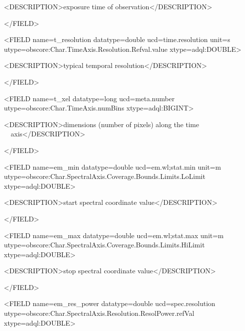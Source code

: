 \documentclass[11pt,a4paper]{ivoa}
\begin{document}
 {\textless}DESCRIPTION{\textgreater}exposure time of observation{\textless}/DESCRIPTION{\textgreater}

{\textless}/FIELD{\textgreater}

{\textless}FIELD name={\textquotedbl}t\_resolution{\textquotedbl} datatype={\textquotedbl}double{\textquotedbl}
ucd={\textquotedbl}time.resolution{\textquotedbl} unit={\textquotedbl}s{\textquotedbl}
utype={\textquotedbl}obscore:Char.TimeAxis.Resolution.Refval.value{\textquotedbl}
xtype={\textquotedbl}adql:DOUBLE{\textquotedbl}{\textgreater}

 {\textless}DESCRIPTION{\textgreater}typical temporal resolution{\textless}/DESCRIPTION{\textgreater}

{\textless}/FIELD{\textgreater}

{\textless}FIELD name={\textquotedbl}t\_xel{\textquotedbl} datatype={\textquotedbl}long{\textquotedbl}
ucd={\textquotedbl}meta.number{\textquotedbl} utype={\textquotedbl}obscore:Char.TimeAxis.numBins{\textquotedbl}
xtype={\textquotedbl}adql:BIGINT{\textquotedbl}{\textgreater}

 {\textless}DESCRIPTION{\textgreater}dimensions (number of pixels) along the time
\ \ axis{\textless}/DESCRIPTION{\textgreater}

{\textless}/FIELD{\textgreater}

{\textless}FIELD name={\textquotedbl}em\_min{\textquotedbl} datatype={\textquotedbl}double{\textquotedbl}
ucd={\textquotedbl}em.wl;stat.min{\textquotedbl} unit={\textquotedbl}m{\textquotedbl}
utype={\textquotedbl}obscore:Char.SpectralAxis.Coverage.Bounds.Limits.LoLimit{\textquotedbl}
xtype={\textquotedbl}adql:DOUBLE{\textquotedbl}{\textgreater}

 {\textless}DESCRIPTION{\textgreater}start spectral coordinate value{\textless}/DESCRIPTION{\textgreater}

{\textless}/FIELD{\textgreater}

{\textless}FIELD name={\textquotedbl}em\_max{\textquotedbl} datatype={\textquotedbl}double{\textquotedbl}
ucd={\textquotedbl}em.wl;stat.max{\textquotedbl} unit={\textquotedbl}m{\textquotedbl}
utype={\textquotedbl}obscore:Char.SpectralAxis.Coverage.Bounds.Limits.HiLimit{\textquotedbl}
xtype={\textquotedbl}adql:DOUBLE{\textquotedbl}{\textgreater}

 {\textless}DESCRIPTION{\textgreater}stop spectral coordinate value{\textless}/DESCRIPTION{\textgreater}

{\textless}/FIELD{\textgreater}

{\textless}FIELD name={\textquotedbl}em\_res\_power{\textquotedbl} datatype={\textquotedbl}double{\textquotedbl}
ucd={\textquotedbl}spec.resolution{\textquotedbl}
utype={\textquotedbl}obscore:Char.SpectralAxis.Resolution.ResolPower.refVal{\textquotedbl}
xtype={\textquotedbl}adql:DOUBLE{\textquotedbl}{\textgreater}
\end{document}
